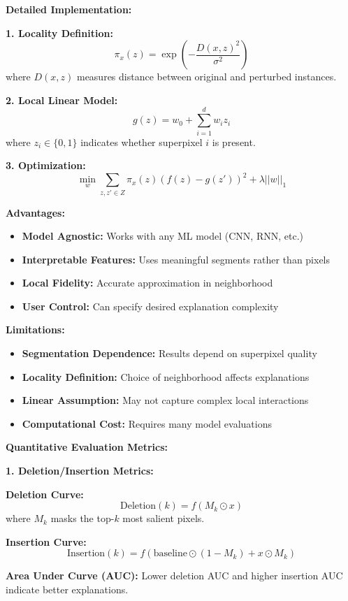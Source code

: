 \documentclass[12pt]{article}
\begin{document}
\begin{enumerate}[(a)]
{    \textbf{Detailed Implementation:}
    
    \textbf{1. Locality Definition:}
    $$\pi_x(z) = \exp\left(-\frac{D(x, z)^2}{\sigma^2}\right)$$
    where $D(x, z)$ measures distance between original and perturbed instances.
    
    \textbf{2. Local Linear Model:}
    $$g(z) = w_0 + \sum_{i=1}^d w_i z_i$$
    where $z_i \in \{0, 1\}$ indicates whether superpixel $i$ is present.
    
    \textbf{3. Optimization:}
    $$\min_w \sum_{z,z' \in Z} \pi_x(z) (f(z) - g(z'))^2 + \lambda ||w||_1$$
    
    \textbf{Advantages:}
    \begin{itemize}
        \item \textbf{Model Agnostic:} Works with any ML model (CNN, RNN, etc.)
        \item \textbf{Interpretable Features:} Uses meaningful segments rather than pixels
        \item \textbf{Local Fidelity:} Accurate approximation in neighborhood
        \item \textbf{User Control:} Can specify desired explanation complexity
    \end{itemize}
    
    \textbf{Limitations:}
    \begin{itemize}
        \item \textbf{Segmentation Dependence:} Results depend on superpixel quality
        \item \textbf{Locality Definition:} Choice of neighborhood affects explanations
        \item \textbf{Linear Assumption:} May not capture complex local interactions
        \item \textbf{Computational Cost:} Requires many model evaluations
    \end{itemize}
    
    \textbf{Quantitative Evaluation Metrics:}
    
    \textbf{1. Deletion/Insertion Metrics:}
    
    \textbf{Deletion Curve:}
    $$\text{Deletion}(k) = f(M_k \odot x)$$
    where $M_k$ masks the top-$k$ most salient pixels.
    
    \textbf{Insertion Curve:}
    $$\text{Insertion}(k) = f(\text{baseline} \odot (1-M_k) + x \odot M_k)$$
    
    \textbf{Area Under Curve (AUC):}
    Lower deletion AUC and higher insertion AUC indicate better explanations.
    
}
\end{enumerate}
\end{document}
